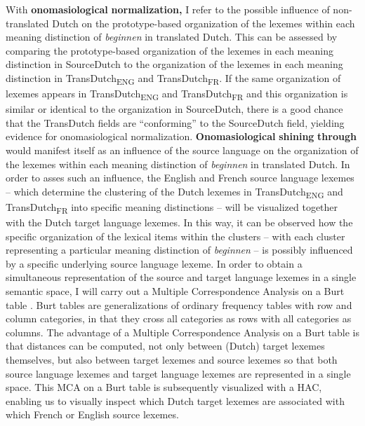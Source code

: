 With \textbf{onomasiological} \textbf{normalization,} I refer to the possible influence of non-translated Dutch on the prototype-based organization of the lexemes within each meaning distinction of \textit{beginnen} in translated Dutch. This can be assessed by comparing the prototype-based organization of the lexemes in each meaning distinction in SourceDutch to the organization of the lexemes in each meaning distinction in TransDutch\textsubscript{ENG} and TransDutch\textsubscript{FR}. If the same organization of lexemes appears in TransDutch\textsubscript{ENG} and TransDutch\textsubscript{FR} and this organization is similar or identical to the organization in SourceDutch, there is a good chance that the TransDutch fields are ``conforming'' to the SourceDutch field, yielding evidence for onomasiological normalization. \textbf{Onomasiological} \textbf{shining} \textbf{through} would manifest itself as an influence of the source language on the organization of the lexemes within each meaning distinction of \textit{beginnen} in translated Dutch. In order to asses such an influence, the English and French source language lexemes – which determine the clustering of the Dutch lexemes in TransDutch\textsubscript{ENG} and TransDutch\textsubscript{FR} into specific meaning distinctions – will be visualized together with the Dutch target language lexemes. In this way, it can be observed how the specific organization of the lexical items within the clusters – with each cluster representing a particular meaning distinction of \textit{beginnen} – is possibly influenced by a specific underlying source language lexeme. In order to obtain a simultaneous representation of the source and target language lexemes in a single semantic space, I will carry out a Multiple Correspondence Analysis on a Burt table \citep{greenacre_simple_2006, greenacre_correspondence_2007}. Burt tables are generalizations of ordinary frequency tables with row and column categories, in that they cross all categories as rows with all categories as columns. The advantage of a Multiple Correspondence Analysis on a Burt table is that distances can be computed, not only between (Dutch) target lexemes themselves, but also between target lexemes and source lexemes so that both source language lexemes and target language lexemes are represented in a single space. This MCA on a Burt table is subsequently visualized with a HAC, enabling us to visually inspect which Dutch target lexemes are associated with which French or English source lexemes.

